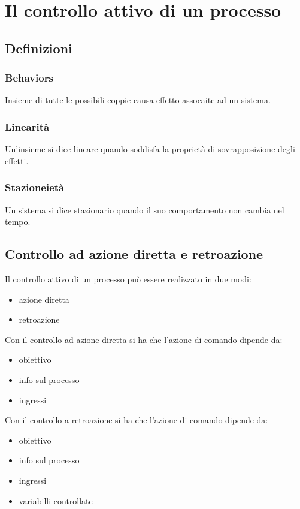 \chapter{Il controllo attivo di un processo}

\section{Definizioni}
\subsection{Behaviors}
Insieme di tutte le possibili coppie causa effetto assocaite ad un sistema.


\subsection{Linearit\`a}
Un'insieme si dice lineare quando soddisfa la propriet\`a di sovrapposizione degli effetti.


\subsection{Stazioneiet\`a}
Un sistema si dice stazionario quando il suo comportamento non cambia nel tempo.

\section{Controllo ad azione diretta e retroazione}

Il controllo attivo di un processo pu\`o essere realizzato in due modi:
\begin{itemize}
  \item azione diretta
  \item retroazione
\end{itemize}

Con il controllo ad azione diretta si ha che l'azione di comando dipende da:
\begin{itemize}
  \item obiettivo
  \item info sul processo
  \item ingressi
\end{itemize}


Con il controllo a retroazione si ha che l'azione di comando dipende da:
\begin{itemize}
  \item obiettivo
  \item info sul processo
  \item ingressi
  \item variabilli controllate
\end{itemize}



